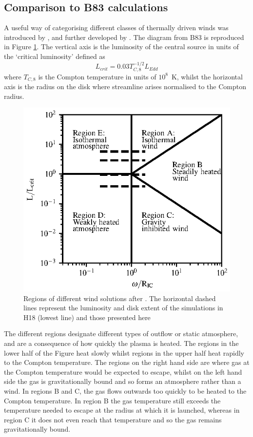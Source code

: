 \documentclass[a4paper,fleqn,usenatbib]{mnras}
\begin{document}
\subsection{Comparison to B83 calculations}
\label{Section:B83}
A useful way of categorising different classes of thermally driven winds was introduced 
by \cite[hereafter B83]{1983ApJ...271...70B}, and further developed by \cite[hereafter W96]{1996ApJ...461..767W}. The
diagram from B83 is reproduced in Figure  \ref{figure:regions}. The vertical axis is the luminosity of the central
source in units of the `critical luminosity' defined as
\begin{equation}
L_{crit}=0.03T_{C,8}^{-1/2}L_{Edd}
\label{L_crit}
\end{equation}
where $T_{C,8}$ is the Compton temperature in units of $10^8$~K,
whilst the horizontal axis is the radius on the disk where streamline arises normalised to the Compton radius. 

\begin{figure}
\includegraphics[width=\columnwidth]{figures/fig7.eps}
\caption{Regions of different wind solutions after \protect\cite{1983ApJ...271...70B}. The horizontal dashed 
lines represent the luminosity and disk extent of the simulations in H18
(lowest line) and those presented here}
\label{figure:regions}
\end{figure}

The different regions designate different types of outflow or static atmosphere, and are a consequence of
how quickly the plasma is heated. The regions in the lower half of the Figure heat slowly 
whilst regions in the upper half heat rapidly to the Compton temperature. The regions on the
right hand side are where gas at the Compton temperature would be expected to escape, whilst on the 
left hand side the gas is gravitationally bound and so forms an atmosphere rather than a wind. 
In regions B and C, the gas flows outwards too quickly to be heated to the Compton temperature. In region
B the gas temperature still exceeds the temperature needed to escape at the radius at which it is launched, 
whereas in region C it does not even reach that temperature and so the gas remains gravitationally
bound.
\end{document}
